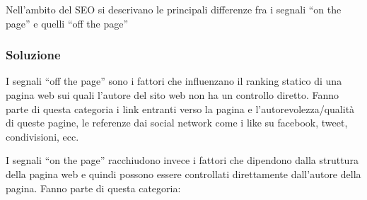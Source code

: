Nell'ambito del SEO si descrivano le principali differenze fra i segnali ``on the page'' e quelli ``off the page''

\subsubsection{Soluzione}

I segnali ``off the page'' sono i fattori che influenzano il ranking statico di una pagina web sui quali l'autore del sito web non ha un controllo diretto. Fanno parte di questa categoria i link entranti verso la pagina e l'autorevolezza/qualità di queste pagine, le referenze dai social network come i like su facebook, tweet, condivisioni, ecc.

I segnali ``on the page'' racchiudono invece i fattori che dipendono dalla struttura della pagina web e quindi possono essere controllati direttamente dall'autore della pagina.
Fanno parte di questa categoria:

